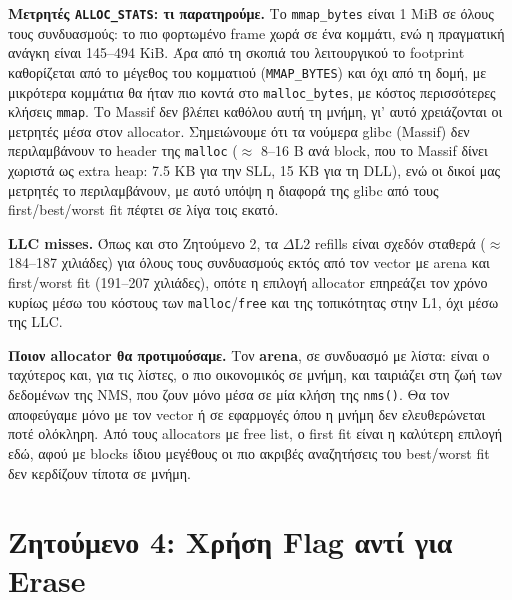 \documentclass[11pt,a4paper]{article}
\newcommand{\en}[1]{\textlatin{#1}}
\begin{document}
\textbf{Μετρητές \en{\texttt{ALLOC\_STATS}}: τι παρατηρούμε.} Το \en{\texttt{mmap\_bytes}} είναι 1 \en{MiB} σε όλους τους συνδυασμούς: το πιο φορτωμένο \en{frame} χωρά σε ένα κομμάτι, ενώ η πραγματική ανάγκη είναι 145--494 \en{KiB}. Άρα από τη σκοπιά του λειτουργικού το \en{footprint} καθορίζεται από το μέγεθος του κομματιού (\en{\texttt{MMAP\_BYTES}}) και όχι από τη δομή, με μικρότερα κομμάτια θα ήταν πιο κοντά στο \en{\texttt{malloc\_bytes}}, με κόστος περισσότερες κλήσεις \en{\texttt{mmap}}. Το \en{Massif} δεν βλέπει καθόλου αυτή τη μνήμη, γι' αυτό χρειάζονται οι μετρητές μέσα στον \en{allocator}. Σημειώνουμε ότι τα νούμερα \en{glibc} (\en{Massif}) δεν περιλαμβάνουν το \en{header} της \en{\texttt{malloc}} ($\approx$ 8--16 \en{B} ανά \en{block}, που το \en{Massif} δίνει χωριστά ως \en{extra heap}: 7.5 \en{KB} για την \en{SLL}, 15 \en{KB} για τη \en{DLL}), ενώ οι δικοί μας μετρητές το περιλαμβάνουν, με αυτό υπόψη η διαφορά της \en{glibc} από τους \en{first/best/worst fit} πέφτει σε λίγα τοις εκατό.

\textbf{\en{LLC misses}.} Όπως και στο Ζητούμενο 2, τα \en{$\Delta$L2 refills} είναι σχεδόν σταθερά ($\approx$ 184--187 χιλιάδες) για όλους τους συνδυασμούς εκτός από τον \en{vector} με \en{arena} και \en{first/worst fit} (191--207 χιλιάδες), οπότε η επιλογή \en{allocator} επηρεάζει τον χρόνο κυρίως μέσω του κόστους των \en{\texttt{malloc}/\texttt{free}} και της τοπικότητας στην \en{L1}, όχι μέσω της \en{LLC}.

\textbf{Ποιον \en{allocator} θα προτιμούσαμε.} Τον \textbf{\en{arena}}, σε συνδυασμό με λίστα: είναι ο ταχύτερος και, για τις λίστες, ο πιο οικονομικός σε μνήμη, και ταιριάζει στη ζωή των δεδομένων της \en{NMS}, που ζουν μόνο μέσα σε μία κλήση της \en{\texttt{nms()}}. Θα τον αποφεύγαμε μόνο με τον \en{vector} ή σε εφαρμογές όπου η μνήμη δεν ελευθερώνεται ποτέ ολόκληρη. Από τους \en{allocators} με \en{free list}, ο \en{first fit} είναι η καλύτερη επιλογή εδώ, αφού με \en{blocks} ίδιου μεγέθους οι πιο ακριβές αναζητήσεις του \en{best/worst fit} δεν κερδίζουν τίποτα σε μνήμη.

\section{Ζητούμενο 4: Χρήση \en{Flag} αντί για \en{Erase}}
\end{document}
